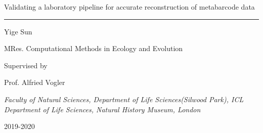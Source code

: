 \documentclass[11pt, a4paper]{article}
\begin{document}
 

\begin{titlepage} %
\nolinenumbers
	\centering %
	
	\vspace*{\baselineskip} %
	

	\vspace{0.75\baselineskip} %
	
	{\LARGE Validating a laboratory pipeline for accurate reconstruction of metabarcode data} %
	
	\vspace{0.75\baselineskip} %
	
	\rule{\textwidth}{1.6pt} %
	
	\vspace{2\baselineskip} %
	
	
	{\Large Yige Sun} %
	\vspace*{0.5\baselineskip} %
	
	MRes. Computational Methods in Ecology and Evolution
	\vspace*{3\baselineskip} %
	
	
	Supervised by

	\vspace{0.5\baselineskip} %
	
	Prof. Alfried Vogler %
	
	\vspace{0.5\baselineskip} %
	
	\textit{Faculty of Natural Sciences, Department of Life Sciences(Silwood Park), ICL\\
	Department of Life Sciences, Natural History Museum, London} %
	
	\vfill %
	
	\vspace{0.3\baselineskip} %
	
	{\LARGE 2019-2020} 

\end{titlepage}
\end{document}
